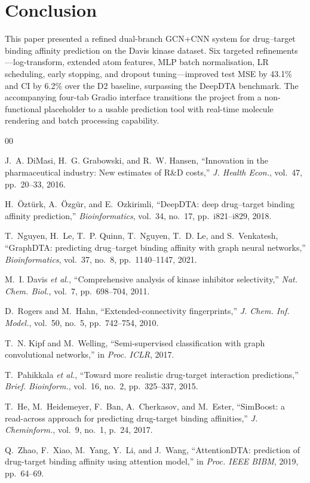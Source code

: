 \documentclass[conference]{IEEEtran}
\begin{document}
\section{Conclusion}

This paper presented a refined dual-branch GCN+CNN system for drug--target
binding affinity prediction on the Davis kinase dataset. Six targeted
refinements---log-transform, extended atom features, MLP batch normalisation,
LR scheduling, early stopping, and dropout tuning---improved test MSE by
43.1\% and CI by 6.2\% over the D2 baseline, surpassing the DeepDTA
benchmark. The accompanying four-tab Gradio interface transitions the project
from a non-functional placeholder to a usable prediction tool with real-time
molecule rendering and batch processing capability.

\begin{thebibliography}{00}

J.~A. DiMasi, H.~G. Grabowski, and R.~W. Hansen,
``Innovation in the pharmaceutical industry: New estimates of R\&D costs,''
\textit{J. Health Econ.}, vol.~47, pp.~20--33, 2016.

H.~\"{O}zt\"{u}rk, A.~\"{O}zg\"{u}r, and E.~Ozkirimli,
``DeepDTA: deep drug--target binding affinity prediction,''
\textit{Bioinformatics}, vol.~34, no.~17, pp.~i821--i829, 2018.

T.~Nguyen, H.~Le, T.~P. Quinn, T.~Nguyen, T.~D. Le, and S.~Venkatesh,
``GraphDTA: predicting drug--target binding affinity with graph neural networks,''
\textit{Bioinformatics}, vol.~37, no.~8, pp.~1140--1147, 2021.

M.~I. Davis \textit{et al.},
``Comprehensive analysis of kinase inhibitor selectivity,''
\textit{Nat. Chem. Biol.}, vol.~7, pp.~698--704, 2011.

D.~Rogers and M.~Hahn,
``Extended-connectivity fingerprints,''
\textit{J. Chem. Inf. Model.}, vol.~50, no.~5, pp.~742--754, 2010.

T.~N. Kipf and M.~Welling,
``Semi-supervised classification with graph convolutional networks,''
in \textit{Proc. ICLR}, 2017.

T.~Pahikkala \textit{et al.},
``Toward more realistic drug-target interaction predictions,''
\textit{Brief. Bioinform.}, vol.~16, no.~2, pp.~325--337, 2015.

T.~He, M.~Heidemeyer, F.~Ban, A.~Cherkasov, and M.~Ester,
``SimBoost: a read-across approach for predicting drug-target binding affinities,''
\textit{J. Cheminform.}, vol.~9, no.~1, p.~24, 2017.

Q.~Zhao, F.~Xiao, M.~Yang, Y.~Li, and J.~Wang,
``AttentionDTA: prediction of drug-target binding affinity using attention model,''
in \textit{Proc. IEEE BIBM}, 2019, pp.~64--69.

\end{thebibliography}
\end{document}
